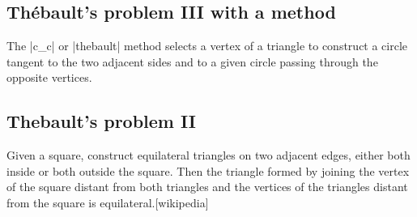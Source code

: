 
\subsection{Thébault's problem III with a method} %
\label{sub:_thebault_s_problem_iii_fold}

The |c_c| or |thebault| method selects a vertex of a triangle to construct a circle tangent to the two adjacent sides and to a given circle passing through the opposite vertices.

\begin{tkzexample}[latex = .5\textwidth]
\begin{center}
\end{center}

\end{tkzexample}



\subsection{Thebault's problem II} %
\label{sub:thebault_s_problemII}

Given a square, construct equilateral triangles on two adjacent edges, either both inside or both outside the square. Then the triangle formed by joining the vertex of the square distant from both triangles and the vertices of the triangles distant from the square is equilateral.[wikipedia]

